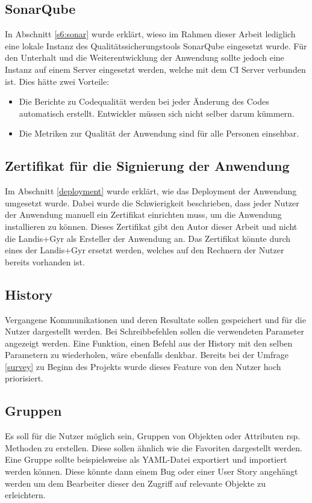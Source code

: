 \subsection{SonarQube}
In Abschnitt \ref{s6:sonar} wurde erklärt, wieso im Rahmen dieser Arbeit lediglich eine lokale Instanz des Qualitätssicherungstools SonarQube eingesetzt wurde.
Für den Unterhalt und die Weiterentwicklung der Anwendung sollte jedoch eine Instanz auf einem Server eingesetzt werden, welche mit dem \ac{CI} Server verbunden ist.
Dies hätte zwei Vorteile:
\begin{itemize}
   \item Die Berichte zu Codequalität werden bei jeder Änderung des Codes automatisch erstellt. 
Entwickler müssen sich nicht selber darum kümmern.
   \item Die Metriken zur Qualität der Anwendung sind für alle Personen einsehbar.
\end{itemize}


\subsection{Zertifikat für die Signierung der Anwendung}\label{ausblick:cert}
Im Abschnitt \ref{deployment} wurde erklärt, wie das Deployment der Anwendung umgesetzt wurde.
Dabei wurde die Schwierigkeit beschrieben, dass jeder Nutzer der Anwendung manuell ein Zertifikat einrichten muss, um die Anwendung installieren zu können.
Dieses Zertifikat gibt den Autor dieser Arbeit und nicht die Landis+Gyr als Ersteller der Anwendung an.
Das Zertifikat könnte durch eines der Landis+Gyr ersetzt werden, welches auf den Rechnern der Nutzer bereits vorhanden ist.


\subsection{History}
Vergangene Kommunikationen und deren Resultate sollen gespeichert und für die Nutzer dargestellt werden.
Bei Schreibbefehlen sollen die verwendeten Parameter angezeigt werden.
Eine Funktion, einen Befehl aus der History mit den selben Parametern zu wiederholen, wäre ebenfalls denkbar.
Bereits bei der Umfrage \ref{survey} zu Beginn des Projekts wurde dieses Feature von den Nutzer hoch priorisiert.

\subsection{Gruppen}
Es soll für die Nutzer möglich sein, Gruppen von Objekten oder Attributen rsp. Methoden zu erstellen.
Diese sollen ähnlich wie die Favoriten dargestellt werden.
Eine Gruppe sollte beispielsweise als \ac{YAML}-Datei exportiert und importiert werden können.
Diese könnte dann einem Bug oder einer User Story angehängt werden um dem Bearbeiter dieser den Zugriff auf relevante Objekte zu erleichtern.

